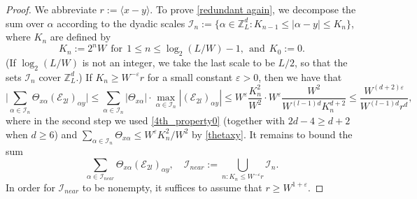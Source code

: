 \documentclass{article}
\newcommand{\1}{\mathds{1}}
\numberwithin{equation}{section}
\newcommand{\al}{\alpha}
\newcommand{\be}{\begin{equation}}
\newcommand{\ee}{\end{equation}}
\newcommand{\e}{{\varepsilon}}
\renewcommand{\cal}{\mathcal}
\renewcommand{\leq}{\leqslant}
\renewcommand{\geq}{\geqslant}
\renewcommand{\le}{\leq}
\renewcommand{\ge}{\geq}
\newcommand{\Z}{\mathbb{Z}}
\theoremstyle{plain} %
\theoremstyle{remark}
\newcommand{\Sele}{{\mathcal E}}
\newcommand{\Selek}{{\mathcal E}}
\begin{document}
 \begin{proof}
We abbreviate $r:=\langle x-y\rangle$. To prove \eqref{redundant again}, we decompose the sum over $\al$ according to the dyadic scales $ \cal I_{n}:=\{\al \in \Z_L^d: K_{n-1} \le |\al-y| \le K_{n}\}$, where $K_n$ are defined by
\be\label{defn Kn}
K_n:= 2^n W \ \ \text{for}\ \ 1\le n \le \log_2 (L/W)-1, \ \ \text{and}\ \  K_{0}:=0.
\ee
(If $\log_2(L/W)$ is not an integer, we take the last scale to be $L/2$, so that the sets $\cal I_n$ cover $\Z_L^d$.)
If $K_n\ge W^{-\e} r$ for a small constant $\e>0$, then we have that
\be\label{boundIfar} \Big| \sum_{\al\in \cal I_{n}}\Theta_{ x \al} (\Selek_{2l})_{\al y}\Big| \le   \sum_{\al\in \cal I_{n}}\left|\Theta_{ x \al}\right| \cdot \max_{\al\in \cal I_n} \left|(\Selek_{2l})_{\al y}\right| \le W^\e\frac{K_n^2}{W^2} \cdot W^\e\frac{W^2}{W^{(l-1)d} K_n^{d+2}}\le \frac{W^{(d+2)\e}}{W^{(l-1)d} r^{d}},\ee
where in the second step we used \eqref{4th_property0} (together with $2d-4\ge d+2$ when $d\ge 6$) and $\sum_{\al\in \cal I_{n}}\Theta_{ x \al}\le W^\e {K_n^2}/{W^2}$ by \eqref{thetaxy}. It remains to bound the sum
$$\sum_{\al\in \cal I_{near}}\Theta_{x \al} (\Selek_{2l})_{\al y},\quad \cal I_{near}:=\bigcup_{n: K_n \le W^{-\e}r} \cal I_n .$$
In order for $\cal I_{near}$ to be nonempty, it suffices to assume that $r\ge W^{1+\e}$. 


\end{proof}
\end{document}
